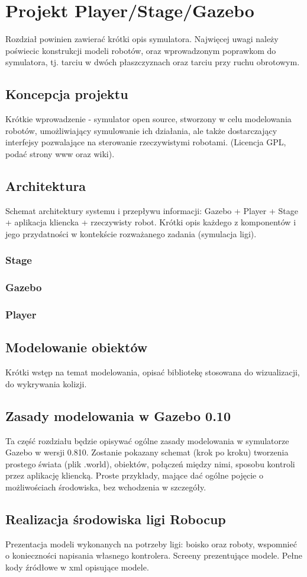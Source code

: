 \chapter{Projekt Player/Stage/Gazebo}
	Rozdział powinien zawierać krótki opis symulatora. Najwięcej uwagi należy poświecic konstrukcji modeli robotów, oraz wprowadzonym
	poprawkom do symulatora, tj. tarciu w dwóch płaszczyznach oraz tarciu przy ruchu obrotowym.
	\section{Koncepcja projektu}
	Krótkie wprowadzenie - symulator open source, stworzony w celu modelowania
	robotów, umożliwiający symulowanie ich działania, ale także dostarczający interfejsy pozwalające na
	sterowanie rzeczywistymi robotami. (Licencja GPL, podać strony www oraz wiki).
	\section{Architektura}
	Schemat architektury systemu i przepływu informacji:
 	Gazebo + Player + Stage + aplikacja kliencka + rzeczywisty robot.
 	Krótki opis każdego z komponentów i jego przydatności w kontekście rozważanego zadania (symulacja ligi).
 	\subsection{Stage}	
 	\subsection{Gazebo}
 	\subsection{Player}
 	
	\section{Modelowanie obiektów}
	Krótki wstęp na temat modelowania, opisać bibliotekę stosowana do wizualizacji, do wykrywania kolizji.

	\section{Zasady modelowania w Gazebo 0.10}
	Ta część rozdziału będzie opisywać ogólne zasady modelowania w symulatorze Gazebo w wersji 0.810. Zostanie
	pokazany schemat (krok po kroku) tworzenia prostego świata (plik .world), obiektów, połączeń między nimi, 
	sposobu kontroli przez aplikację kliencką. Proste przykłady, mające dać ogólne pojęcie o możliwościach środowiska,
	bez wchodzenia w szczegóły.
	
	\section{Realizacja środowiska ligi Robocup}
	Prezentacja modeli wykonanych na potrzeby ligi: boisko oraz roboty, wspomnieć o konieczności napisania własnego 
	kontrolera. Screeny prezentujące modele. Pełne kody źródłowe w xml opisujące modele.